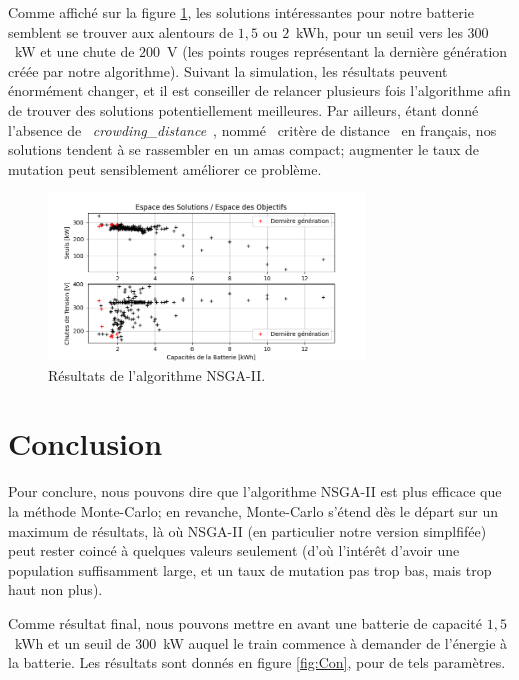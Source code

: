 \documentclass[11pt, a4paper, oneside, portrait]{report}
\begin{document}
        Comme affiché sur la figure \ref{fig:NSGA2}, les solutions intéressantes pour notre batterie semblent se trouver aux alentours de $1,5$ ou $2$~kWh, pour un seuil vers les $300$~kW et une chute de $200$~V (les points rouges représentant la dernière génération créée par notre algorithme).
        Suivant la simulation, les résultats peuvent énormément changer, et il est conseiller de relancer plusieurs fois l'algorithme afin de trouver des solutions potentiellement meilleures.
        Par ailleurs, étant donné l'absence de \guillemotleft{}~\emph{crowding\_distance}~\guillemotright{}, nommé \guillemotleft{}~critère de distance~\guillemotright{} en français, nos solutions tendent à se rassembler en un amas compact; augmenter le taux de mutation peut sensiblement améliorer ce problème.

        \begin{figure}[H]
            \centering
            \includegraphics[width=0.75\textwidth]{Figures/NSGA-II.png}
            \caption{Résultats de l'algorithme NSGA-II.}
            \label{fig:NSGA2}
        \end{figure}


    \section*{Conclusion}
        Pour conclure, nous pouvons dire que l'algorithme NSGA-II est plus efficace que la méthode Monte-Carlo; en revanche, Monte-Carlo s'étend dès le départ sur un maximum de résultats, là où NSGA-II (en particulier notre version simplfifée) peut rester coincé à quelques valeurs seulement (d'où l'intérêt d'avoir une population suffisamment large, et un taux de mutation pas trop bas, mais trop haut non plus).

        Comme résultat final, nous pouvons mettre en avant une batterie de capacité $1,5$~kWh et un seuil de $300$~kW auquel le train commence à demander de l'énergie à la batterie.
        Les résultats sont donnés en figure \ref{fig:Con}, pour de tels paramètres.
\end{document}
